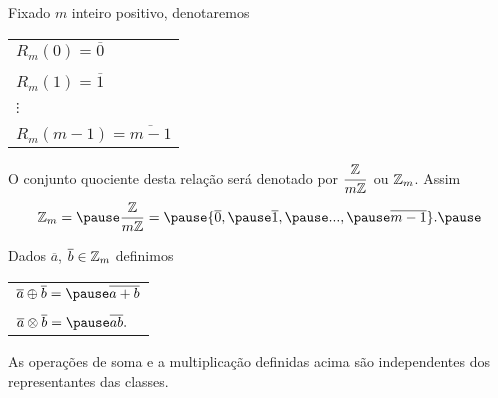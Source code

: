 \documentclass{beamer}
\begin{document}
    \begin{frame}
        \begin{observacao}
        Fixado $m$ inteiro positivo, \pause denotaremos\pause
        \begin{center}
            \begin{tabular}{l}
                $R_{m}(0) = \overline{0}$\pause \\
                \\
                $R_{m}(1) = \overline{1}$\pause \\
                \\
                $\vdots$\\
                \\
                $R_{m}(m-1) = \overline{m-1}$\pause
            \end{tabular}
        \end{center}

        O conjunto quociente \pause desta rela{\c c}{\~a}o ser{\'a} denotado por $\displaystyle\frac{\mathbb{Z}}{m\mathbb{Z}}$ \pause ou $\mathbb{Z}_m$. \pause Assim\pause
        \[
            \z_m = \pause \displaystyle\frac{\z}{m\z} = \pause \{\overline{0}, \pause \overline{1}, \pause ..., \pause \overline{m-1}\}.\pause
        \]
        \end{observacao}
    \end{frame}

    \begin{frame}
        \begin{definicao}
            Dados $\overline{a}$, $\overline{b} \in \mathbb{Z}_m$ definimos\pause
            \begin{center}
                \begin{tabular}{l}
                    $\overline{a}\oplus\overline{b} = \pause \overline{a + b}\label{soma_modulo_m}$\pause \\
                    \\
                    $\overline{a}\otimes\overline{b} = \pause \overline{ab}.\label{multiplicacao_modulo_m}$\pause
                \end{tabular}
            \end{center}
        \end{definicao}

        \begin{proposicao}
            As opera{\c c}{\~o}es de soma \pause e a multiplica\c{c}\~ao \pause definidas acima s{\~a}o independentes dos representantes das classes.
        \end{proposicao}
    \end{frame}
\end{document}
